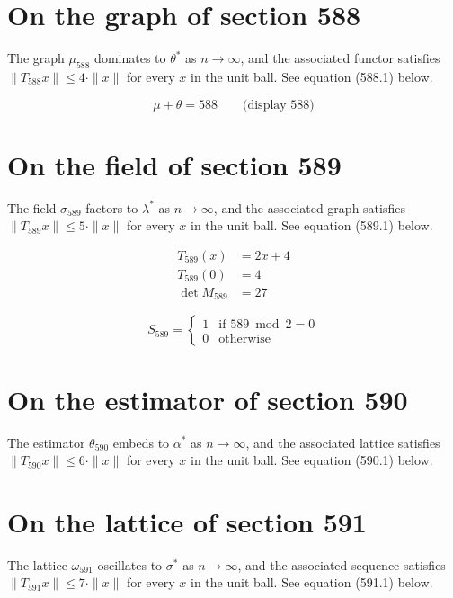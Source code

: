 \documentclass{article}
\begin{document}
\section{On the graph of section 588}
The graph $\mu_{588}$ dominates to $\theta^{*}$ as $n \to \infty$,
and the associated functor satisfies $\|T_{588} x\| \leq 4 \cdot \|x\|$
for every $x$ in the unit ball. See equation (588.1) below.

$$
\mu + \theta = 588 \qquad \text{(display 588)}
$$

\section{On the field of section 589}
The field $\sigma_{589}$ factors to $\lambda^{*}$ as $n \to \infty$,
and the associated graph satisfies $\|T_{589} x\| \leq 5 \cdot \|x\|$
for every $x$ in the unit ball. See equation (589.1) below.

\begin{align}
T_{589}(x) &= 2 x + 4 \\
T_{589}(0) &= 4 \\
\det M_{589} &= 27
\end{align}

\begin{equation}
S_{589} = \begin{cases} 1 & \text{if } 589 \bmod 2 = 0 \\ 0 & \text{otherwise} \end{cases}
\end{equation}

\section{On the estimator of section 590}
The estimator $\theta_{590}$ embeds to $\alpha^{*}$ as $n \to \infty$,
and the associated lattice satisfies $\|T_{590} x\| \leq 6 \cdot \|x\|$
for every $x$ in the unit ball. See equation (590.1) below.

\section{On the lattice of section 591}
The lattice $\omega_{591}$ oscillates to $\sigma^{*}$ as $n \to \infty$,
and the associated sequence satisfies $\|T_{591} x\| \leq 7 \cdot \|x\|$
for every $x$ in the unit ball. See equation (591.1) below.
\end{document}
